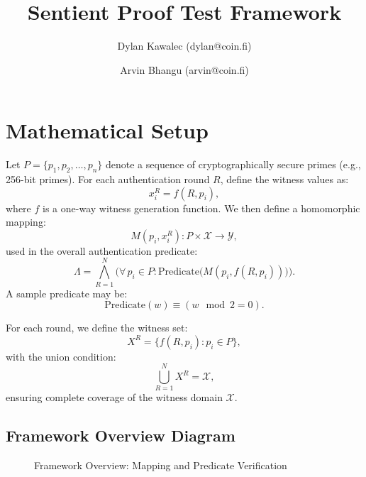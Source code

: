 \documentclass[10pt,twocolumn]{article}
\begin{document}
\vspace{0.5cm}

\title{\bfseries Sentient Proof Test Framework}
\author{\small Dylan Kawalec (dylan@coin.fi) \and Arvin Bhangu (arvin@coin.fi)}
\date{}
\maketitle


\section{Mathematical Setup}
Let \(P = \{p_1, p_2, \dots, p_n\}\) denote a sequence of cryptographically secure primes (e.g., 256-bit primes). For each authentication round \(R\), define the witness values as:
\[
x_i^R = f(R, p_i),
\]
where \(f\) is a one-way witness generation function. We then define a homomorphic mapping:
\[
M(p_i, x_i^R): P \times \mathcal{X} \to \mathcal{Y},
\]
used in the overall authentication predicate:
\[
\Lambda = \bigwedge_{R=1}^{N} \Big( \forall\, p_i \in P: \text{Predicate}\big(M(p_i, f(R, p_i))\big) \Big).
\]
A sample predicate may be:
\[
\text{Predicate}(w) \equiv (w \mod 2 = 0).
\]

For each round, we define the witness set:
\[
X^R = \{ f(R, p_i) : p_i \in P \},
\]
with the union condition:
\[
\bigcup_{R=1}^{N} X^R = \mathcal{X},
\]
ensuring complete coverage of the witness domain \(\mathcal{X}\).

\subsection{Framework Overview Diagram}
\begin{figure}[!htbp]
\centering
{}
\caption{Framework Overview: Mapping and Predicate Verification}
\label{fig:framework-overview}
\end{figure}
\end{document}
